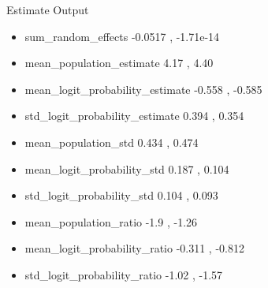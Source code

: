 \documentclass{beamer}
\begin{document}
\begin{frame}{Estimate Output}
\begin{itemize}

\item
sum\_random\_effects
\hspace{4.9em} -0.0517 , -1.71e-14
\pause

\item
mean\_population\_estimate
\hspace{2.5em} 4.17 , 4.40
\pause

\item
mean\_logit\_probability\_estimate
\hspace{0.0em} -0.558 , -0.585
\pause

\item
std\_logit\_probability\_estimate
\hspace{1.3em} 0.394  , 0.354
\pause

\item
mean\_population\_std
\hspace{4.7em} 0.434 , 0.474
\pause

\item
mean\_logit\_probability\_std
\hspace{2.5em} 0.187 , 0.104
\pause

\item
std\_logit\_probability\_std
\hspace{3.5em} 0.104 , 0.093
\pause

\item
mean\_population\_ratio
\hspace{3.7em} -1.9 , -1.26
\pause

\item
mean\_logit\_probability\_ratio
\hspace{1.5em} -0.311 , -0.812
\pause

\item
std\_logit\_probability\_ratio
\hspace{2.5em} -1.02  , -1.57
\pause


\end{itemize}
\end{frame}
\end{document}
